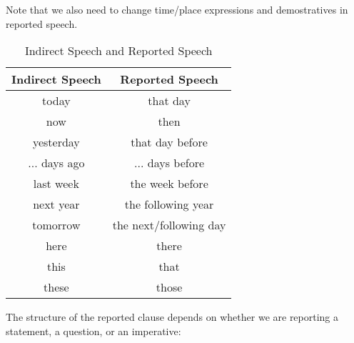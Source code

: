 \documentclass[hidelinks,10pt,a4paper]{article}
\begin{document}
Note that we also need to change time/place expressions and demostratives in reported speech.

\begin{table}[h!]
\begin{center}
\begin{tabular}{|c|c|}
	\hline
	\textbf{Indirect Speech} & \textbf{Reported Speech} \\ \hline
	today & that day \\ \hline
	now & then \\ \hline
	yesterday & that day before \\ \hline
	... days ago & ... days before \\ \hline
	last week & the week before \\ \hline
	next year & the following year \\ \hline
	tomorrow & the next/following day \\ \hline
	here & there \\ \hline
	this & that \\ \hline
	these & those \\ \hline
\end{tabular}
\end{center}
\caption{Indirect Speech and Reported Speech} \label{tab:isrs}
\end{table}

The structure of the reported clause depends on whether we are reporting a statement, a question, or an imperative:
\end{document}
